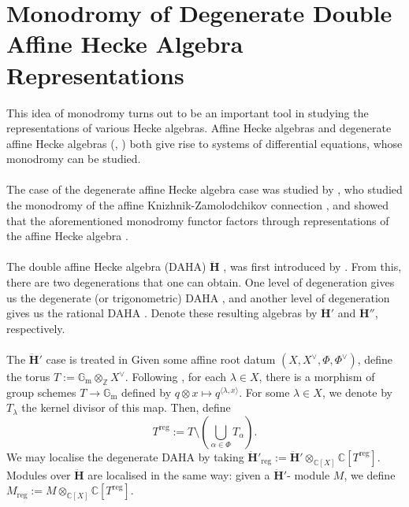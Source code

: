 \documentclass[a4paper]{report}
\theoremstyle{theorem}
\theoremstyle{definition}
\theoremstyle{remark}
\theoremstyle{proposition}
\theoremstyle{conjecture}
\theoremstyle{lemma}
\theoremstyle{corollary}
\theoremstyle{exercise}
\theoremstyle{example}
\newcommand{\C}{\mathbb{C}}
\newcommand{\on}{\operatorname}
\begin{document}
  \chapter{Monodromy of Degenerate Double Affine Hecke Algebra Representations}\label{app_B}
  
  This idea of monodromy turns out to be an important tool in studying the 
  representations of various Hecke algebras. Affine Hecke algebras 
  \cite[Definition 3]{kir97} and degenerate affine Hecke algebras (\cite[Definition 1]{kir97}, \cite[Definition 4]{che90}) 
  both give rise to systems of differential equations, whose 
  monodromy can be studied.\\\\
  The case of the degenerate affine Hecke algebra
  case was studied by \cite{che90}, who studied the monodromy of the affine 
  Knizhnik-Zamolodchikov connection \cite[(21)]{che90}, 
  and showed that the aforementioned 
  monodromy functor factors through representations of the affine Hecke algebra 
  \cite[Theorem 10]{che90}.\\\\
  The double affine Hecke algebra (DAHA) $\mathbf{\ddot{\mathbf{H}}}$ \cite[Definition 4]{kir97}, was first introduced by \cite{che95}. From this, there are two degenerations that one can obtain. One level
  of degeneration gives us the degenerate (or trigonometric) DAHA \cite[(2.1.1)]{vv04}, and another level of degeneration gives us the rational DAHA \cite[Section 3.1]{ggor03}. Denote these resulting algebras by $\mathbf{\ddot{\mathbf{H}}}'$ and 
  $\mathbf{\ddot{\mathbf{H}}}''$, respectively. \\\\
  The $\mathbf{\ddot{\mathbf{H}}}'$ case is treated in \cite{vv04}
  Given some affine root datum \cite[Section 3]{kir97} $(X,X^\vee,\Phi,\Phi^\vee)$, define the torus $T := \mathbb{G}_{\on{m}}\otimes_\mathbb{Z} X^\vee$.
  Following \cite[Section 1]{gkv95}, for each $\lambda \in X$, there is a morphism of group schemes
  $T \to \mathbb{G}_{\on{m}}$ defined by $q \otimes x \mapsto q^{\langle \lambda,x\rangle}$. For some $\lambda \in X$, we denote by $T_\lambda$
  the kernel divisor of this map. Then, define $$T^{\on{reg}} := T\setminus \left(\bigcup_{\alpha \in \Phi} T_\alpha\right).$$
  We may localise the degenerate DAHA by taking $\mathbf{\ddot{\mathbf{H}}}'_{\on{reg}} := \ddot{\mathbf{H}}' \otimes_{\C[X]} \C[T^{\on{reg}}]$.
  Modules over $\mathbf{\ddot{\mathbf{H}}}$ 
  are localised in the same way: given a $\mathbf{\ddot{\mathbf{H}}}'$-
  module $M$, we define $M_{\on{reg}} := M \otimes_{\C[X]} \C[T^{\on{reg}}]$. 
\end{document}
